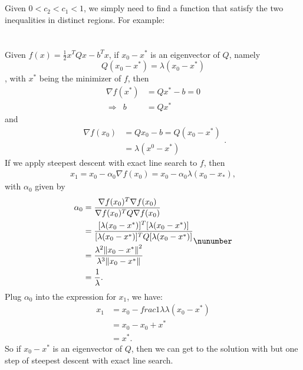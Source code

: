 \documentclass[11pt]{article}
\begin{document}
\maketitle
\section{}
Given $0<c_2<c_1<1$, we simply need to find a function that satisfy the two inequalities in distinct regions. For example:

\section{}
Given $f(x) = \frac12x^TQx-b^Tx$, if $x_0-x^*$ is an eigenvector of $Q$, namely $$Q(x_0-x^*) = \lambda(x_0-x^*)$$, with $x^*$ being the minimizer of $f$, then
\begin{equation}\begin{split} \nabla f(x^*) &= Qx^*-b = 0 \\ \Rightarrow\,\,\, b &= Qx^* \end{split}\nonumber\end{equation} 
and
\begin{equation}\begin{split} \nabla f(x_0) &= Qx_0-b = Q(x_0-x^*)\\&=\lambda(x^0-x^*)\end{split}.\nonumber\end{equation} 
If we apply steepest descent with exact line search to $f$, then
\begin{equation}\begin{split} x_1 = x_0 - \alpha_0\nabla f(x_0) = x_0 - \alpha_0\lambda(x_0-x_*),\end{split}\nonumber\end{equation}
with $\alpha_0$ given by
\begin{equation}\begin{split}\alpha_0 &= \frac{\nabla f(x_0)^T\nabla f(x_0)}{\nabla f(x_0)^TQ\nabla f(x_0)} \\
&= \frac{[\lambda(x_0-x^*)]^T[\lambda(x_0-x^*)]}{[\lambda(x_0-x^*)]^TQ[\lambda(x_0-x^*)]}\\
&= \frac{\lambda^2\norm{x_0-x^*}^2}{\lambda^3\norm{x_0-x^*}}\\
&= \frac1{\lambda}.
\end{split}\nunumber\end{equation}
Plug $\alpha_0$ into the expression for $x_1$, we have:
\begin{equation}\begin{split} 
x_1 &= x_0 -frac1{\lambda}\lambda(x_0-x^*)\\
&=x_0 - x_0 + x^*\\
&=x^*.
\end{split}\nonumber\end{equation} 
So if $x_0-x^*$ is an eigenvector of $Q$, then we can get to the solution with but one step of steepest descent with exact line search.
\end{document}
